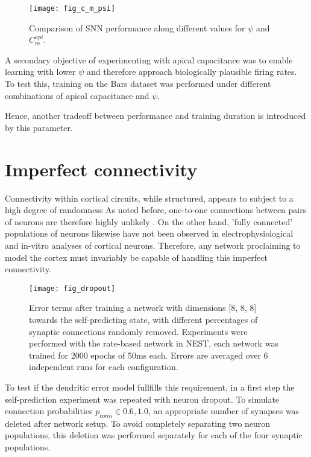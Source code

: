 \begin{figure}[h]
    \centering
    \texttt{[image: fig\_c\_m\_psi]}
    \caption{Comparison of SNN performance along different values for $\psi$ and $C_m^{api}$.}
    \label{fig-c-m-psi}
\end{figure}

A secondary objective of experimenting with apical capacitance was to enable learning with lower $\psi$ and therefore
approach biologically plausible firing rates. To test this, training on the Bars dataset was performed under different
combinations of apical capacitance and $\psi$. 



Hence, another tradeoff between performance and training duration is introduced by this parameter.


\section{Imperfect connectivity}

Connectivity within cortical circuits, while structured, appears to subject to a high degree of randomness
\citep{potjans2014cell} As noted before, one-to-one connections between pairs of neurons are therefore highly unlikely
\citep{whittington2019theories}. On the other hand, 'fully connected' populations of neurons likewise have not been
observed in electrophysiological \citep{thomson2002synaptic} and in-vitro \citep{binzegger2004quantitative} analyses of
cortical neurons. Therefore, any network proclaiming to model the cortex must invariably be capable of handling this
imperfect connectivity.

\begin{figure}[h]
    \centering
    \texttt{[image: fig\_dropout]}
    \caption{Error terms after training a network with dimensions [8, 8, 8] towards the self-predicting state, with
        different percentages of synaptic connections randomly removed. Experiments were performed with the
        rate-based network in NEST, each network was trained for 2000 epochs of 50ms each. Errors are averaged over
        6 independent runs for each configuration.}
    \label{fig-dropout}
\end{figure}

To test if the dendritic error model fullfills this requirement, in a first step the self-prediction experiment was
repeated with neuron dropout. To simulate connection probabilities $p_{conn} \in {0.6, 1.0}$, an appropriate number of
synapses was deleted after network setup. To avoid completely separating two neuron populations, this deletion was
performed separately for each of the four synaptic populations.

